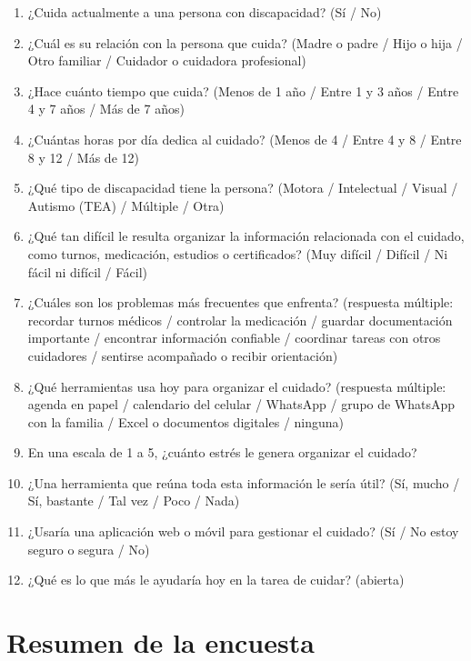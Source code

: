 \begin{enumerate}
    \item ¿Cuida actualmente a una persona con discapacidad? (Sí / No)
    \item ¿Cuál es su relación con la persona que cuida? (Madre o padre / Hijo o hija / Otro familiar / Cuidador o cuidadora profesional)
    \item ¿Hace cuánto tiempo que cuida? (Menos de 1 año / Entre 1 y 3 años / Entre 4 y 7 años / Más de 7 años)
    \item ¿Cuántas horas por día dedica al cuidado? (Menos de 4 / Entre 4 y 8 / Entre 8 y 12 / Más de 12)
    \item ¿Qué tipo de discapacidad tiene la persona? (Motora / Intelectual / Visual / Autismo (TEA) / Múltiple / Otra)
    \item ¿Qué tan difícil le resulta organizar la información relacionada con el cuidado, como turnos, medicación, estudios o certificados? (Muy difícil / Difícil / Ni fácil ni difícil / Fácil)
    \item ¿Cuáles son los problemas más frecuentes que enfrenta? (respuesta múltiple: recordar turnos médicos / controlar la medicación / guardar documentación importante / encontrar información confiable / coordinar tareas con otros cuidadores / sentirse acompañado o recibir orientación)
    \item ¿Qué herramientas usa hoy para organizar el cuidado? (respuesta múltiple: agenda en papel / calendario del celular / WhatsApp / grupo de WhatsApp con la familia / Excel o documentos digitales / ninguna)
    \item En una escala de 1 a 5, ¿cuánto estrés le genera organizar el cuidado?
    \item ¿Una herramienta que reúna toda esta información le sería útil? (Sí, mucho / Sí, bastante / Tal vez / Poco / Nada)
    \item ¿Usaría una aplicación web o móvil para gestionar el cuidado? (Sí / No estoy seguro o segura / No)
    \item ¿Qué es lo que más le ayudaría hoy en la tarea de cuidar? (abierta)
\end{enumerate}

\section{Resumen de la encuesta}

